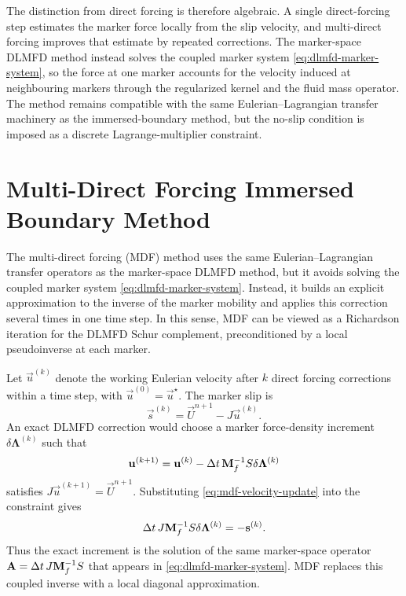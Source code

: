The distinction from direct forcing is therefore algebraic. A single
direct-forcing step estimates the marker force locally from the slip velocity,
and multi-direct forcing improves that estimate by repeated corrections. The
marker-space DLMFD method instead solves the coupled marker system
\eqref{eq:dlmfd-marker-system}, so the force at one marker accounts for the
velocity induced at neighbouring markers through the regularized kernel and the
fluid mass operator. The method remains compatible with the same
Eulerian--Lagrangian transfer machinery as the immersed-boundary method, but
the no-slip condition is imposed as a discrete Lagrange-multiplier constraint.

\section{Multi-Direct Forcing Immersed Boundary Method}

The multi-direct forcing (MDF) method uses the same Eulerian--Lagrangian
transfer operators as the marker-space DLMFD method, but it avoids solving the
coupled marker system \eqref{eq:dlmfd-marker-system}. Instead, it builds an
explicit approximation to the inverse of the marker mobility and applies this
correction several times in one time step. In this sense, MDF can be viewed as
a Richardson iteration for the DLMFD Schur complement, preconditioned by a
local pseudoinverse at each marker.

Let \(\vec u^{(k)}\) denote the working Eulerian velocity after \(k\) direct
forcing corrections within a time step, with \(\vec u^{(0)}=\vec u^\star\). The
marker slip is
\begin{equation}
    \vec s^{(k)}
    = \vec U^{n+1} - J\vec u^{(k)} .
    \label{eq:mdf-slip}
\end{equation}
An exact DLMFD correction would choose a marker force-density increment
\(\delta\bm\Lambda^{(k)}\) such that
\begin{equation}
    \mathbf{u}^{(k+1)}
    = \mathbf{u}^{(k)}
    - \Delta t\,\mathbf{M}_f^{-1}S\delta\bm\Lambda^{(k)}
    \label{eq:mdf-velocity-update}
\end{equation}
satisfies \(J\vec u^{(k+1)}=\vec U^{n+1}\). Substituting
\eqref{eq:mdf-velocity-update} into the constraint gives
\begin{equation}
    \Delta t\,J\mathbf{M}_f^{-1}S\delta\bm\Lambda^{(k)}
    = -\mathbf{s}^{(k)} .
    \label{eq:mdf-exact-increment}
\end{equation}
Thus the exact increment is the solution of the same marker-space operator
\(\mathbf{A}=\Delta t\,J\mathbf{M}_f^{-1}S\) that appears in
\eqref{eq:dlmfd-marker-system}. MDF replaces this coupled inverse with a local
diagonal approximation.

